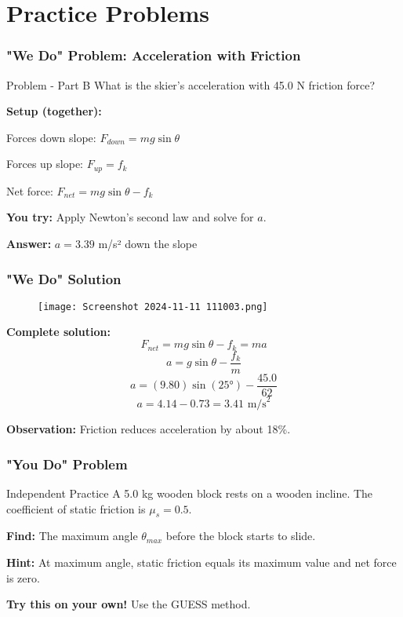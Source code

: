 \documentclass{beamer}
\begin{document}
\section{Practice Problems}

\begin{frame}
\frametitle{"We Do" Problem: Acceleration with Friction}
\begin{block}{Problem - Part B}
What is the skier's acceleration with 45.0 N friction force?
\end{block}

\pause
\textbf{Setup (together):}

Forces down slope: $F_{down} = mg\sin\theta$

Forces up slope: $F_{up} = f_k$

Net force: $F_{net} = mg\sin\theta - f_k$

\pause
\textbf{You try:} Apply Newton's second law and solve for $a$.

\pause
\textbf{Answer:} $a = 3.39$ m/s² down the slope
\end{frame}

\begin{frame}
\frametitle{"We Do" Solution}
\begin{figure}[H]
    \centering
    \texttt{[image: Screenshot 2024-11-11 111003.png]}
\end{figure}

\textbf{Complete solution:}
\[ F_{net} = mg\sin\theta - f_k = ma \]
\[ a = g\sin\theta - \frac{f_k}{m} \]
\[ a = (9.80)\sin(25°) - \frac{45.0}{62} \]
\[ a = 4.14 - 0.73 = 3.41\text{ m/s}^2 \]

\textbf{Observation:} Friction reduces acceleration by about 18\%.
\end{frame}

\begin{frame}
\frametitle{"You Do" Problem}
\begin{block}{Independent Practice}
A 5.0 kg wooden block rests on a wooden incline. The coefficient of static friction is $\mu_s = 0.5$.

\vspace{0.5em}
\textbf{Find:} The maximum angle $\theta_{max}$ before the block starts to slide.

\vspace{0.5em}
\textbf{Hint:} At maximum angle, static friction equals its maximum value and net force is zero.
\end{block}

\vspace{1em}
\pause
\textbf{Try this on your own!} Use the GUESS method.
\end{frame}
\end{document}
